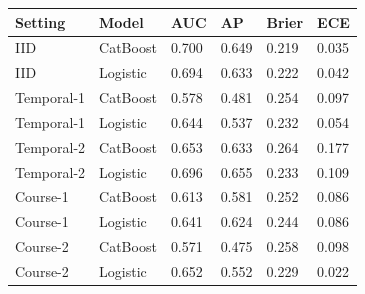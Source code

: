 \begin{tabular}{llllll}
\toprule
Setting & Model & AUC & AP & Brier & ECE\\
\midrule
IID & CatBoost & 0.700 & 0.649 & 0.219 & 0.035\\
IID & Logistic & 0.694 & 0.633 & 0.222 & 0.042\\
Temporal-1 & CatBoost & 0.578 & 0.481 & 0.254 & 0.097\\
Temporal-1 & Logistic & 0.644 & 0.537 & 0.232 & 0.054\\
Temporal-2 & CatBoost & 0.653 & 0.633 & 0.264 & 0.177\\
Temporal-2 & Logistic & 0.696 & 0.655 & 0.233 & 0.109\\
Course-1 & CatBoost & 0.613 & 0.581 & 0.252 & 0.086\\
Course-1 & Logistic & 0.641 & 0.624 & 0.244 & 0.086\\
Course-2 & CatBoost & 0.571 & 0.475 & 0.258 & 0.098\\
Course-2 & Logistic & 0.652 & 0.552 & 0.229 & 0.022\\
\bottomrule
\end{tabular}